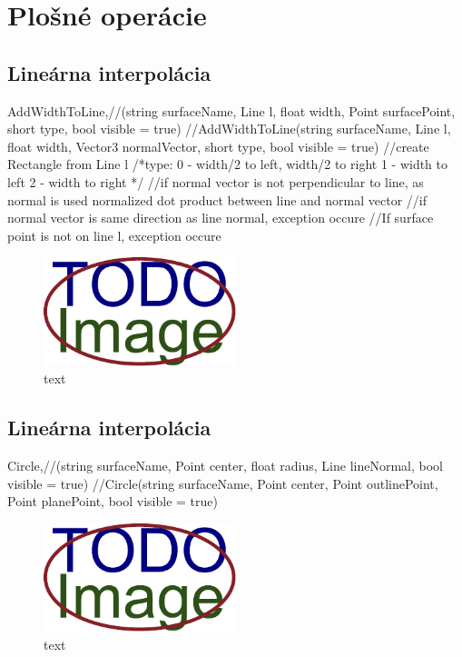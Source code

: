 \section{Plošné operácie}


\subsection{Lineárna interpolácia}
	AddWidthToLine,//(string surfaceName, Line l, float width, Point surfacePoint, short type, bool visible = true)
	//AddWidthToLine(string surfaceName, Line l, float width, Vector3 normalVector, short type, bool visible = true)
//create Rectangle from Line l
/*type:
	0 - width/2 to left, width/2 to right
	1 - width to left
	2 - width to right
	*/
	//if normal vector is not perpendicular to line, as normal is used normalized dot product between line and normal vector
	//if normal vector is same direction as line normal, exception occure
	//If surface point is not on line l, exception occure

\begin{figure}[H]
	\centering
	\includegraphics[width=0.5\textwidth]{obrazky-figures/placeholder.pdf}
	\caption{text}
	\label{fig:1}
\end{figure}

\subsection{Lineárna interpolácia}
	Circle,//(string surfaceName, Point center, float radius, Line lineNormal, bool visible = true)
	//Circle(string surfaceName, Point center, Point outlinePoint, Point planePoint, bool visible = true)

\begin{figure}[H]
	\centering
	\includegraphics[width=0.5\textwidth]{obrazky-figures/placeholder.pdf}
	\caption{text}
	\label{fig:1}
\end{figure}


